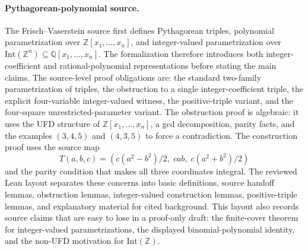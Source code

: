 \documentclass{article}
\newcommand{\lean}{Lean\xspace}
\begin{document}
\paragraph{Pythagorean-polynomial source.} \label{app:docs-case-study}
The Frisch--Vaserstein source first defines Pythagorean triples, polynomial parametrization over $\mathbb{Z}[x_1,\ldots,x_n]$, and integer-valued parametrization over $\mathrm{Int}(\mathbb{Z}^n)\subseteq \mathbb{Q}[x_1,\ldots,x_n]$.
The formalization therefore introduces both integer-coefficient and rational-polynomial representations before stating the main claims.
The source-level proof obligations are: the standard two-family parametrization of triples, the obstruction to a single integer-coefficient triple, the explicit four-variable integer-valued witness, the positive-triple variant, and the four-square unrestricted-parameter variant.
The obstruction proof is algebraic: it uses the UFD structure of $\mathbb{Z}[x_1,\ldots,x_n]$, a gcd decomposition, parity facts, and the examples $(3,4,5)$ and $(4,3,5)$ to force a contradiction.
The construction proof uses the source map
\[
  T(a,b,c)=\left(c(a^2-b^2)/2,\;cab,\;c(a^2+b^2)/2\right)
\]
and the parity condition that makes all three coordinates integral.
The reviewed \lean layout separates these concerns into basic definitions, source handoff lemmas, obstruction lemmas, integer-valued construction lemmas, positive-triple lemmas, and explanatory material for cited background.
This layout also records source claims that are easy to lose in a proof-only draft: the finite-cover theorem for integer-valued parametrizations, the displayed binomial-polynomial identity, and the non-UFD motivation for $\mathrm{Int}(\mathbb{Z})$.
\end{document}
